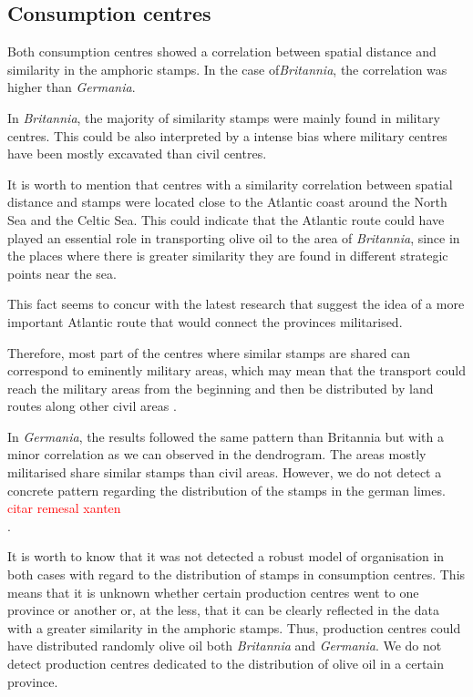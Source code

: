\documentclass[review]{elsarticle}
\newcommand{\memo}[2]{\textcolor{#1}{#2}}
\newcommand{\maria}[1]{\memo{red}{#1\\}}
\begin{document}
\subsection{Consumption centres}

Both consumption centres showed a correlation between spatial distance and similarity in the amphoric stamps. In the case of\textit{Britannia}, the correlation was higher than \textit{Germania}.

In \textit{Britannia}, the majority of similarity stamps were mainly found in military centres. This could be also interpreted by a intense bias where military centres have been mostly excavated than civil centres. 

It is worth to mention that centres with a similarity correlation between  spatial distance and stamps were located close to the Atlantic coast around the North Sea and the Celtic Sea. This could indicate that the Atlantic route could have played an essential role in transporting olive oil to the area of \textit{Britannia}, since in the places where there is greater similarity they are found in different strategic points near the sea.

This fact seems to concur with the latest research that suggest the idea of a more important Atlantic route that would connect the provinces militarised\citep{remesal_annona_1986,
remesal_provincial_2008,
carreras_atlantic_2012,
morillo_hispania_2016,rubio-campillo_provincias_2018}.

Therefore, most part of the centres where similar stamps are shared can correspond to eminently military areas, which may mean that the transport could reach the military areas from the beginning and then be distributed by land routes along other civil areas \citep{carreras_britannia_1998,
ayllon_olive_2018}.

In \textit{Germania}, the results followed the same pattern than Britannia but with a minor correlation as we can observed in the dendrogram. The areas mostly militarised share similar stamps than civil areas. However, we do not detect a concrete pattern regarding the distribution of the stamps in the german limes. \maria{citar remesal xanten}.

It is worth to know that it was not detected a robust model of organisation in both cases with regard to the distribution of stamps in consumption centres. This means
that it is unknown whether certain production centres went to one province or another or, at the
less, that it can be clearly reflected in the data with a greater similarity in the amphoric stamps. Thus, production centres could have distributed randomly olive oil both \textit{Britannia} and \textit{Germania}. We do not detect production centres dedicated to the distribution of olive oil in a certain province. 
\end{document}
